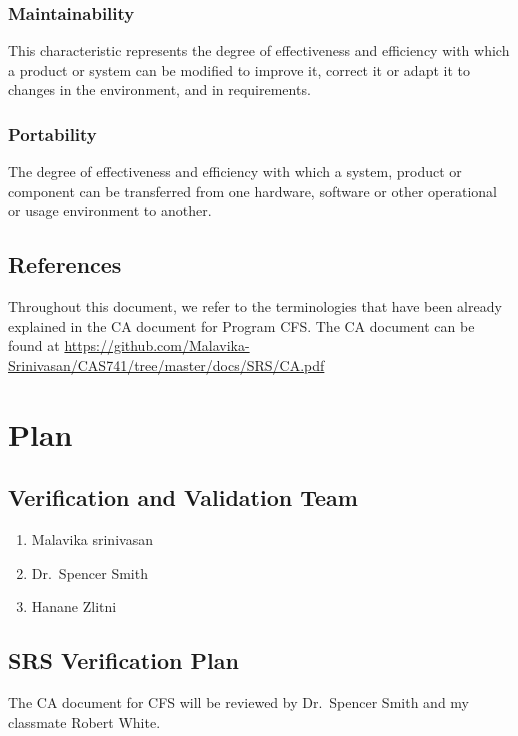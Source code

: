 \documentclass[12pt, titlepage]{article}
\newcommand{\famname}{CFS} %
\begin{document}
\subsubsection{Maintainability}
This characteristic represents the degree of effectiveness and efficiency with
which a product or system can be modified to improve it, correct it or adapt it
to changes in the environment, and in requirements. 

\subsubsection{Portability}
The degree of effectiveness and efficiency with which a system, product or
component can be transferred from one hardware, software or other operational
or usage environment to another. 


\subsection{References}

Throughout this document, we refer to the terminologies that have been already
explained in the CA document for Program \famname{}. The CA document can be
found at
\sloppy
\url{https://github.com/Malavika-Srinivasan/CAS741/tree/master/docs/SRS/CA.pdf} 

\section{Plan}
	
\subsection{Verification and Validation Team}

\begin{enumerate}
	\item Malavika srinivasan
	\item Dr.\ Spencer Smith
	\item Hanane Zlitni
\end{enumerate}


\subsection{SRS Verification Plan}

The CA document for \famname{} will be reviewed by Dr.\ Spencer Smith
and my classmate Robert White.
\end{document}

